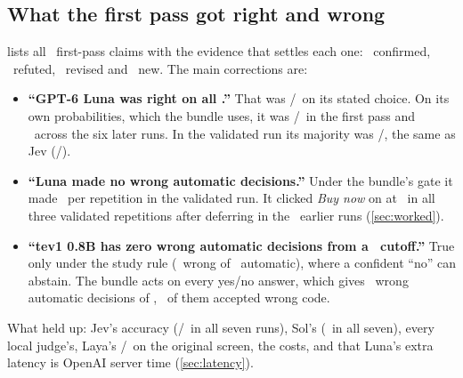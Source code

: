 \subsection{What the first pass got right and wrong}

 lists all \ChangesN\ first-pass claims with the evidence that settles each one:
\ChangesConfirmed\ confirmed, \ChangesRefuted\ refuted, \ChangesRevised\ revised and \ChangesNew\ new.
The main corrections are:
\begin{itemize}
  \item \textbf{``GPT-6 Luna was right on all \DevN.''} That was \FpLunaStudyK/\DevN\ on its stated
    choice. On its own probabilities, which the bundle uses, it was \FpLunaArgmaxK/\DevN\ in the first
    pass and \LunaSixRunRange\ across the six later runs. In the validated run its majority was
    \LunaDevAccK/\DevN, the same as Jev (\JevDevAccK/\DevN).
  \item \textbf{``Luna made no wrong automatic decisions.''} Under the bundle's gate it made
    \LunaDevWaRange\ per repetition in the validated run. It clicked \emph{Buy now} on 
    at \ExLunaPRange\ in all three validated repetitions after deferring in the \ExLunaFpRuns\ earlier runs
    (\cref{sec:worked}).
  \item \textbf{``tev1 0.8B has zero wrong automatic decisions from a \FpCutoff\ cutoff.''} True only under
    the study rule (\FpTevPtEightCutWa\ wrong of \FpTevPtEightCutAuto\ automatic), where a confident
    ``no'' can abstain. The bundle acts on every yes/no answer, which gives \FpTevPtEightBundleWa\ wrong
    automatic decisions of \DevN, \TevPtEightDevAwc\ of them accepted wrong code.
\end{itemize}
What held up: Jev's accuracy (\JevSevenRunRange/\DevN\ in all seven runs), Sol's (\SolSevenRunRange\ in
all seven), every local judge's, Laya's \LayaOriginalK/\LayaOriginalN\ on the original screen, the
costs, and that Luna's extra latency is OpenAI server time (\cref{sec:latency}).

{\small
\setlength{\tabcolsep}{4pt}
\renewcommand{\arraystretch}{1.1}

}
